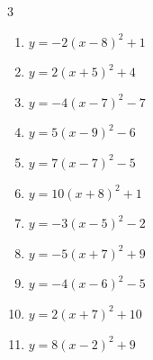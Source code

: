 \begin{multicols}{3}
\begin{enumerate}
        \phantom{$\displaystyle 頂点\left( -8 , -6 \right)$}

\columnbreak %

  \item $\displaystyle y=-2\left( x-8\right)^{2}+1$

        \phantom{$\displaystyle 頂点\left( 8 , 1 \right)$}

  \item $\displaystyle y=2\left( x+5\right)^{2}+4$

        \phantom{$\displaystyle 頂点\left( -5 , 4 \right)$}

  \item $\displaystyle y=-4\left( x-7\right)^{2}-7$

        \phantom{$\displaystyle 頂点\left( 7 , -7 \right)$}

  \item $\displaystyle y=5\left( x-9\right)^{2}-6$

        \phantom{$\displaystyle 頂点\left( 9 , -6 \right)$}

  \item $\displaystyle y=7\left( x-7\right)^{2}-5$

        \phantom{$\displaystyle 頂点\left( 7 , -5 \right)$}

  \item $\displaystyle y=10\left( x+8\right)^{2}+1$

        \phantom{$\displaystyle 頂点\left( -8 , 1 \right)$}

  \item $\displaystyle y=-3\left( x-5\right)^{2}-2$

        \phantom{$\displaystyle 頂点\left( 5 , -2 \right)$}

  \item $\displaystyle y=-5\left( x+7\right)^{2}+9$

        \phantom{$\displaystyle 頂点\left( -7 , 9 \right)$}

  \item $\displaystyle y=-4\left( x-6\right)^{2}-5$

        \phantom{$\displaystyle 頂点\left( 6 , -5 \right)$}

  \item $\displaystyle y=2\left( x+7\right)^{2}+10$

        \phantom{$\displaystyle 頂点\left( -7 , 10 \right)$}

  \item $\displaystyle y=8\left( x-2\right)^{2}+9$


\end{enumerate}
\end{multicols}
